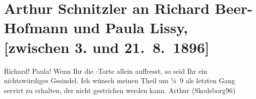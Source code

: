 

         
         \renewcommand{\erwaehntePersonen}{Personen: Richard Beer-Hofmann, Paula Beer-Hofmann}
         \renewcommand{\erwaehnteOrte}{Orte: Skodsborg}
         \renewcommand{\erwaehnteWerke}{}
               \section[Arthur Schnitzler an Richard Beer-Hofmann und Paula Lissy, {[}zwischen 3. und 21. 8. 1896{]}]{ Arthur Schnitzler an Richard Beer-Hofmann und Paula Lissy, {[}zwischen 3.
               und 21. 8. 1896{]}}\nopagebreak{}\rehead{ }\begin{ledgroupsized}[t]{13cm}\normalsize\beginnumbering{} \toendnotes[C]{\smallbreak\pagebreak[2]} 
\toendnotes[C]{\smallbreak}\pstart\center{}{\pb}Richard! Paula!\pend\pstart
           Wenn Ihr die \label{K_L00577-1v}\label{K_L00577-1h}-Torte
               allein auffresst, so seid Ihr ein nichtswürdiges Gesindel. Ich wünsch meinen Theil um
                  ¼ 9 als letzten Gang servirt zu erhalten, der nicht gestrichen werden
               kann. \spacefill\mbox{Arthur}\pend
           \pstart
           (Skodsborg96)\pend
           
         
         \endnumbering{}\end{ledgroupsized}  \newcommand{\dateiname}{L00577}\newcommand{\titel}{Arthur Schnitzler an Richard Beer-Hofmann und Paula Lissy, [zwischen 3. und 21. 8. 1896]}\newcommand{\editorInnen}{Martin Anton Müller und Gerd-Hermann Susen}
      